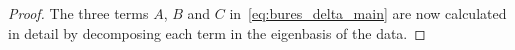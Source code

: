 \documentclass[11pt]{article}
\newcommand{\tr}[1]{\operatorname{Tr}\left({#1}\right)}
\newcommand{\EE}{\mathbb{E}}
\newcommand{\diag}[1]{\operatorname{Diag}\left({#1}\right)}
\begin{document}
\begin{proof}
The three terms $A$, $B$ and $C$ in~\eqref{eq:bures_delta_main} are now calculated in detail by decomposing each term in the eigenbasis of the data.

\end{proof}
\end{document}
